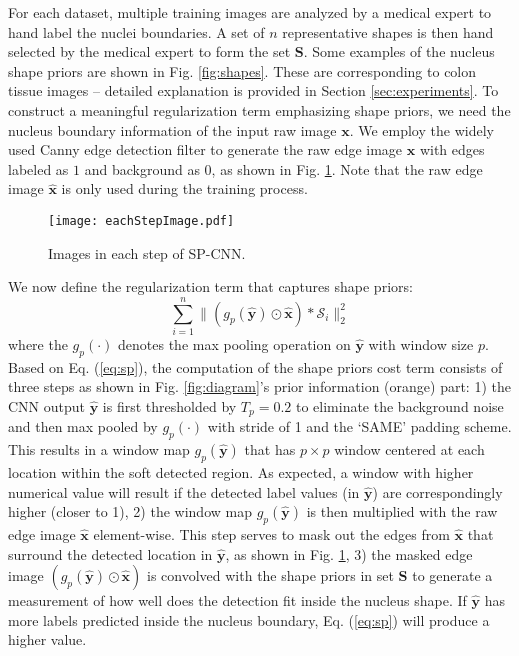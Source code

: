 \documentclass{article}
\begin{document}
For each dataset, multiple training images are analyzed by a medical expert to hand label the nuclei boundaries. A set of $n$ representative shapes is then hand selected by the medical expert to form the set $\mathbf S$. Some examples of the nucleus shape priors are shown in Fig. \ref{fig:shapes}. These are corresponding to colon tissue images -- detailed explanation is provided in Section \ref{sec:experiments}.  To construct a meaningful regularization term emphasizing shape priors, we need the nucleus boundary information of the input raw image $\mathbf x$. We employ the widely used Canny edge detection filter \cite{Canny} to generate the raw edge image $\mathbf{\hat{x}}$ with edges labeled as $1$ and background as $0$, as shown in Fig. \ref{fig:sample_patches}. Note that the raw edge image $\mathbf{\hat{x}}$ is only used during the training process.

\begin{figure}
	\centering
	\texttt{[image: eachStepImage.pdf]}
	\vspace{-18pt}
	\caption{\ninept Images in each step of SP-CNN.}\vspace{-10pt}	\label{fig:sample_patches}
\end{figure}

We now define the regularization term that captures shape priors:
\begin{equation}
\sum\limits_{i=1}^{n} \|(g_{p}(\mathbf{\hat{y}})\odot \mathbf{\hat{x}}) \ast \mathcal{S}_i \|_2^2\label{eq:sp}
\end{equation}
where the $g_{p}(\cdot)$ denotes the max pooling operation on $\mathbf{\hat{y}}$ with window size $p$. Based on Eq. (\ref{eq:sp}), the computation of the shape priors cost term consists of three steps as shown in Fig. \ref{fig:diagram}'s prior information (orange) part: 1) the CNN output $\mathbf{\hat{y}}$ is first thresholded by $T_p = 0.2$ to eliminate the background noise and then max pooled by $g_p(\cdot)$ with stride of 1 and the `SAME' padding scheme. This results in a window map $g_p(\mathbf{\hat{y}})$ that has $p\times p$ window centered at each location within the soft detected region. 
As expected, a window with higher numerical value will result if the detected label values (in $\mathbf{\hat{y}}$) are correspondingly higher (closer to 1), 2) the window map $g_p(\mathbf{\hat{y}})$ is then multiplied with the raw edge image $\mathbf{\hat{x}}$ element-wise. This step serves to mask out the edges from $\mathbf{\hat{x}}$ that surround the detected location in $\mathbf{\hat{y}}$, as shown in Fig. \ref{fig:sample_patches}, 3) the masked edge image $(g_{p}(\mathbf{\hat{y}})\odot \mathbf{\hat{x}})$ is convolved with the shape priors in set $\mathbf{S}$ to generate a measurement of how well does the detection fit inside the nucleus shape. If  $\mathbf{\hat{y}}$ has more labels predicted inside the nucleus boundary, Eq. (\ref{eq:sp}) will produce a higher value.
\end{document}
